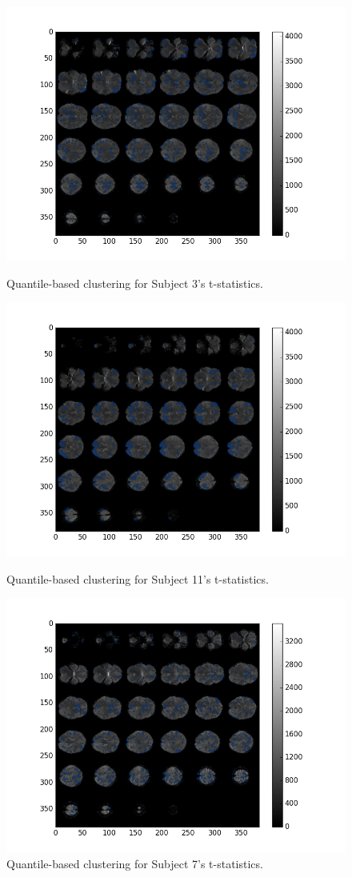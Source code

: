 \begin{figure}[ht]
\centering
\begin{minipage}[b]{0.45\linewidth}
	\centering
	\includegraphics[width=.8\linewidth]{../images/sub003_t_overlay.png} 
	\caption{Quantile-based clustering for Subject 3's t-statistics.}
	\label{fig:clustersub3}
\end{minipage}	

\begin{minipage}[b]{0.45\linewidth}
	\centering
		\includegraphics[width=.8\linewidth]{../images/sub011_t_overlay.png} 
	\caption{Quantile-based clustering for Subject 11's t-statistics.}
	\label{fig:clustersub11}
\end{minipage}

\begin{minipage}[b]{0.45\linewidth}
	\centering
		\includegraphics[width=.8\linewidth]{../images/sub007_t_overlay.png} 
	\caption{Quantile-based clustering for Subject 7's t-statistics.}
	\label{fig:clustersub7}
\end{minipage}
\end{figure}





